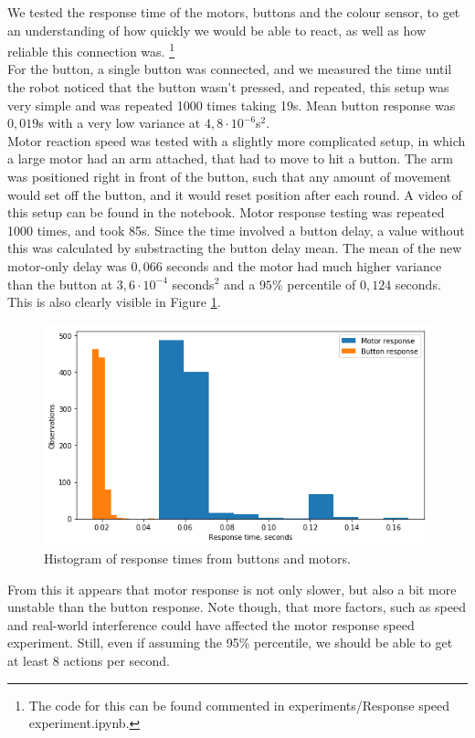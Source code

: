 \documentclass[11pt, a4paper]{article}
\begin{document}
We tested the response time of the motors, buttons and the colour sensor, to get an understanding of how quickly we would be able to react, as well as how reliable this connection was. \footnote{The code for this can be found commented in experiments/Response speed experiment.ipynb.} \\
For the button, a single button was connected, and we measured the time until the robot noticed that the button wasn't pressed, and repeated, this setup was very simple and was repeated 1000 times taking 19s. Mean button response was $0,019$s with a very low variance at $4,8\cdot 10^{-6}$s$^2$. \\
Motor reaction speed was tested with a slightly more complicated setup, in which a large motor had an arm attached, that had to move to hit a button. The arm was positioned right in front of the button, such that any amount of movement would set off the button, and it would reset position after each round. A video of this setup can be found in the notebook. Motor response testing was repeated 1000 times, and took 85s. Since the time involved a button delay, a value without this was calculated by substracting the button delay mean. The mean of the new motor-only delay was $0,066$ seconds and the motor had much higher variance than the button at $3,6\cdot 10^{-4}$ seconds$^2$ and a $95\%$ percentile of $0,124$ seconds. This is also clearly visible in Figure \ref{fig:responsetimemotorbutt}. \\
\begin{figure}[H]
	\centering
	\includegraphics[scale=0.7]{images/motor_button_response_histogram.png}	
	\caption{Histogram of  response times from buttons and motors.}
	\label{fig:responsetimemotorbutt}
\end{figure} 
From this it appears that motor response is not only slower, but also a bit more unstable than the button response. Note though, that more factors, such as speed and real-world interference could have affected the motor response speed experiment. Still, even if assuming the 95\% percentile, we should be able to get at least 8 actions per second.\\
\end{document}

